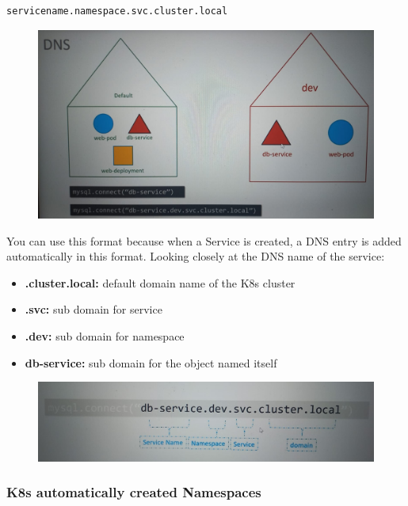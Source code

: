 \documentclass{article}
\newenvironment{codetemplate}[1][]{%
  \mybasecolorbox[#1]
  \itshape
}{%
  \endmybasecolorbox
}
\begin{document}
\begin{codetemplate}{}
\begin{verbatim}
servicename.namespace.svc.cluster.local
\end{verbatim}
\end{codetemplate}

\begin{figure}[H]
    \centering
    \includegraphics[scale=0.22]{pictures/namespace3.jpeg}
\end{figure}

You can use this format because when a Service is created, a DNS entry is added automatically in this format. Looking closely at the DNS name of the service:
\begin{itemize}
    \item \textbf{.cluster.local:} default domain name of the K8s cluster
    \item \textbf{.svc:} sub domain for service
    \item \textbf{.dev:} sub domain for namespace
    \item \textbf{db-service:} sub domain for the object named itself
\end{itemize}

\begin{figure}[H]
    \centering
    \includegraphics[scale=0.3]{pictures/namespace4.jpeg}
\end{figure}

\subsubsection{K8s automatically created Namespaces}
\end{document}
